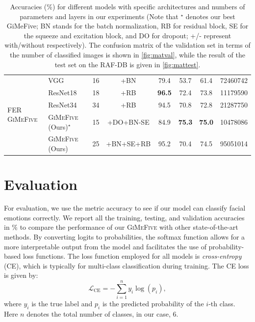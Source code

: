 \begin{table}[ht]
\begin{tabular}{@{}llcccccr@{}}
    \midrule
    \midrule
    \multirow{5}{*}{FER \textsc{GiMeFive}} & VGG~\cite{SimonyanZ14a} & 16 & +BN & 79.4 & 53.7 & 61.4 & 72460742 \\
    & ResNet18~\cite{HeZRS16} & 18 & +RB  & \textbf{96.5} & 72.4 & 73.8 & 11179590 \\
    & ResNet34~\cite{HeZRS16} & 34 & +RB  & 94.5 & 70.8 & 72.8 & 21287750 \\
    &\textsc{GiMeFive} (Ours)\textcolor{LMUGreen}{$^\star$} & 15 & +DO+BN-SE & 84.9 & \textbf{75.3} & \textbf{75.0} & 10478086 \\
    &\textsc{GiMeFive} (Ours) & 25 & +BN+SE+RB & 95.2 & 70.4 & 74.5 & 95051014 \\
    \bottomrule
  \end{tabular}
  \caption{Accuracies (\%) for different models with specific architectures and numbers of parameters and layers in our experiments 
  (Note that \textcolor{LMUGreen}{$^\star$} denotes our best GiMeFive; 
  BN stands for the batch normalization, 
  RB for residual block, 
  SE for the squeeze and excitation block, 
  and DO for dropout; 
  +/- represent with/without respectively). 
  The confusion matrix of the validation set in terms of the number of classified images is shown in \cref{fig:matval}, 
  while the result of the test set on the RAF-DB is given in \cref{fig:mattest}.} 
  \label{tab:model}
\end{table}

\section{Evaluation}
\label{sec:evaluation}

For evaluation, we use the metric accuracy to see if our model can classify facial emotions correctly. 
We report all the training, testing, and validation accuracies in \% 
to compare the performance of our \textsc{GiMeFive} with other state-of-the-art methods. 
By converting logits to probabilities, 
the softmax function allows for a more interpretable output from the model and facilitates the use of probability-based loss functions. 
The loss function employed for all models is \textit{cross-entropy} (CE), 
which is typically for multi-class classification during training. 
The CE loss is given by: 
\begin{equation}
  \label{eq:ce}
  \mathcal{L}_{\text{CE}} = -\sum_{i=1}^{n} y_i \log(p_i),
\end{equation}
where $y_i$ is the true label and $p_i$ is the predicted probability of the $i$-th class. 
Here $n$ denotes the total number of classes, in our case, 6.

